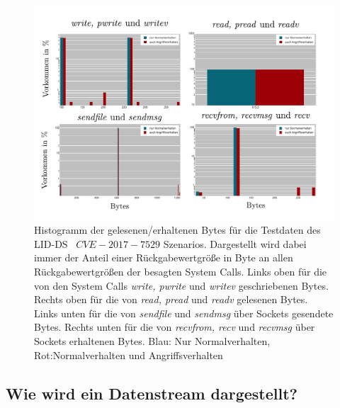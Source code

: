                 \begin{figure}[ht]
                    \centering
                    \includegraphics[width=\textwidth]{images/return_2017_plot.pdf}
                    \caption{Histogramm der gelesenen/erhaltenen Bytes für die Testdaten des \ac{LID-DS}~\cite{LID-DS} $CVE-2017-7529$ Szenarios.
                    Dargestellt wird dabei immer der Anteil einer Rückgabewertgröße in Byte an allen Rückgabewertgrößen der besagten System Calls.
                    Links oben für die von den System Calls \textit{write, pwrite} und \textit{writev} geschriebenen Bytes.
                    Rechts oben für die von \textit{read, pread} und \textit{readv} gelesenen Bytes.
                    Links unten für die von \textit{sendfile} und \textit{sendmsg} über Sockets gesendete Bytes.
                    Rechts unten für die von \textit{recvfrom, recv} und \textit{recvmsg} über Sockets erhaltenen Bytes.
                    Blau: Nur Normalverhalten, Rot:Normalverhalten und Angriffsverhalten}
                    \label{fig:return_values}
                \end{figure}


        \subsection{Wie wird ein Datenstream dargestellt?}\label{sec:streamdarstellung}
        
